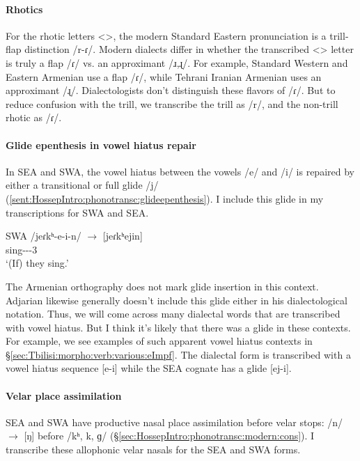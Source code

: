 \paragraph{Rhotics}
For the rhotic letters <>, the modern Standard Eastern pronunciation is a trill-flap distinction /r-ɾ/. Modern dialects differ in whether the transcribed <> letter is truly a flap /ɾ/ vs. an approximant /ɹ,ɻ/. For example, Standard Western and Eastern Armenian use a flap /ɾ/, while Tehrani Iranian Armenian uses an approximant /ɻ/. Dialectologists don't distinguish these flavors of /ɾ/. But to reduce confusion with the trill, we transcribe the trill as /r/, and the non-trill rhotic as /ɾ/. 


\paragraph{Glide epenthesis in vowel hiatus repair}

In SEA and SWA, the vowel hiatus between the vowels /e/ and /i/ is repaired by either a transitional or full glide /j/ (\ref{sent:HossepIntro:phonotransc:glideepenthesis}). I include this glide in my transcriptions for SWA and SEA. 

\begin{exe}
	\ex SWA
	\gll /jeɾkʰ-e-i-n/ $\rightarrow$ [jeɾkʰejin] \\
	sing-{\thgloss}-{\pst}-3{\pl} \\
	\trans `(If) they sing.' \label{sent:HossepIntro:phonotransc:glideepenthesis}\\
\end{exe}



The Armenian orthography does not mark glide insertion in this context. Adjarian likewise generally doesn't include this glide either in his dialectological notation. Thus, we will come across many dialectal words that are transcribed with vowel hiatus. But I think it's likely  that there was a glide in these  contexts. For example, we see examples of such apparent vowel hiatus contexts in \S\ref{sec:Tbilisi:morpho:verb:various:eImpf}. The dialectal form is transcribed with a vowel hiatus sequence [e-i] while the SEA cognate has a glide [ej-i]. 


\paragraph{Velar place assimilation}

SEA and SWA have productive nasal place assimilation before velar stops: /n/ $\rightarrow$ [ŋ] before /kʰ, k, ɡ/ (\S\ref{sec:HossepIntro:phonotransc:modern:cons}). I transcribe these allophonic velar nasals for the SEA and SWA forms. 

